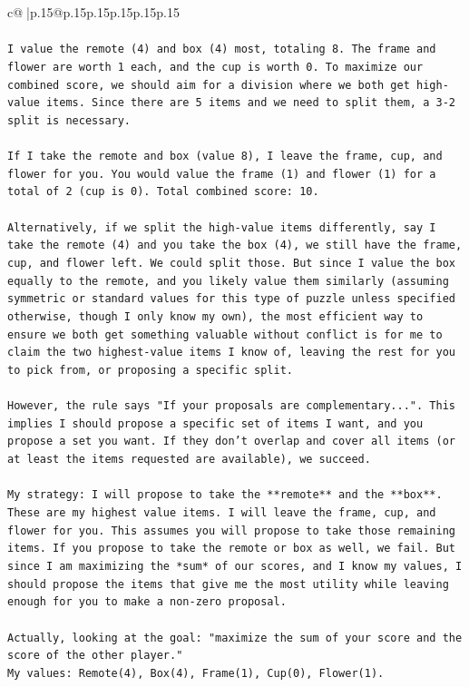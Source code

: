 \documentclass{article}
\begin{document}
{\begin{supertabular}{c@{$\;$}|p{.15\linewidth}@{}p{.15\linewidth}p{.15\linewidth}p{.15\linewidth}p{.15\linewidth}p{.15\linewidth}}
{{{\\ 
\\ 
\texttt{I value the remote (4) and box (4) most, totaling 8. The frame and flower are worth 1 each, and the cup is worth 0. To maximize our combined score, we should aim for a division where we both get high{-}value items. Since there are 5 items and we need to split them, a 3{-}2 split is necessary.} \\
\\ 
\texttt{If I take the remote and box (value 8), I leave the frame, cup, and flower for you. You would value the frame (1) and flower (1) for a total of 2 (cup is 0). Total combined score: 10.} \\
\\ 
\texttt{Alternatively, if we split the high{-}value items differently, say I take the remote (4) and you take the box (4), we still have the frame, cup, and flower left. We could split those. But since I value the box equally to the remote, and you likely value them similarly (assuming symmetric or standard values for this type of puzzle unless specified otherwise, though I only know my own), the most efficient way to ensure we both get something valuable without conflict is for me to claim the two highest{-}value items I know of, leaving the rest for you to pick from, or proposing a specific split.} \\
\\ 
\texttt{However, the rule says "If your proposals are complementary...". This implies I should propose a specific set of items I want, and you propose a set you want. If they don't overlap and cover all items (or at least the items requested are available), we succeed.} \\
\\ 
\texttt{My strategy: I will propose to take the **remote** and the **box**. These are my highest value items. I will leave the frame, cup, and flower for you. This assumes you will propose to take those remaining items. If you propose to take the remote or box as well, we fail. But since I am maximizing the *sum* of our scores, and I know my values, I should propose the items that give me the most utility while leaving enough for you to make a non{-}zero proposal.} \\
\\ 
\texttt{Actually, looking at the goal: "maximize the sum of your score and the score of the other player."} \\
\texttt{My values: Remote(4), Box(4), Frame(1), Cup(0), Flower(1).} \\
}}}
\end{supertabular}}
\end{document}
